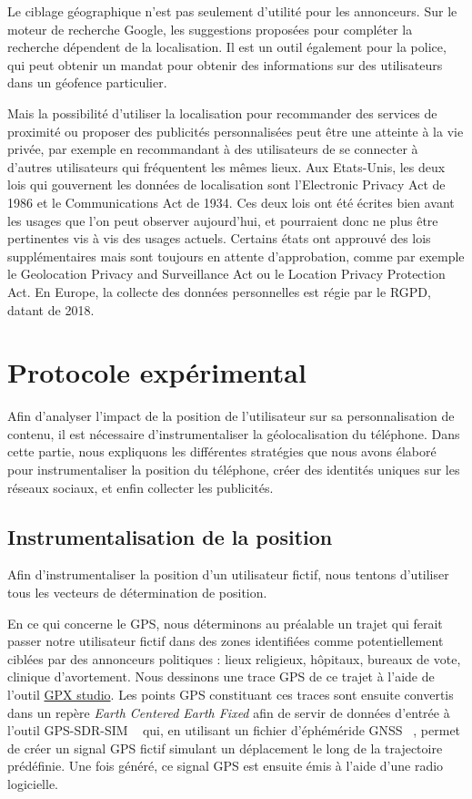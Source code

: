 \documentclass[runningheads]{llncs}
\begin{document}
Le ciblage géographique n'est pas seulement d'utilité pour les annonceurs. Sur le moteur de recherche Google, les suggestions proposées pour compléter la recherche dépendent de la localisation. Il est un outil également pour la police, qui peut obtenir un mandat pour obtenir des informations sur des utilisateurs dans un géofence particulier\cite{ng_how_nodate}.


Mais la possibilité d'utiliser la localisation pour recommander des services de proximité ou proposer des publicités personnalisées peut être une atteinte à la vie privée, par exemple en recommandant à des utilisateurs de se connecter à d'autres utilisateurs qui fréquentent les mêmes lieux. Aux Etats-Unis, les deux lois qui gouvernent les données de localisation sont l'Electronic Privacy Act de
1986 et le Communications Act de 1934. Ces deux lois ont été écrites bien avant les usages que l'on peut observer aujourd'hui, et pourraient donc ne plus être pertinentes vis à vis des usages actuels. Certains états ont approuvé des lois supplémentaires mais sont toujours en attente d'approbation, comme par exemple le Geolocation Privacy and Surveillance Act ou le Location Privacy Protection Act. En Europe, la collecte des données personnelles est régie par le RGPD, datant de 2018\cite{karanja_unintended_2018}.


\section{Protocole expérimental}

Afin d'analyser l'impact de la position de l'utilisateur sur sa personnalisation de contenu, il est nécessaire d'instrumentaliser la géolocalisation du téléphone. 
Dans cette partie, nous expliquons les différentes stratégies que nous avons élaboré pour instrumentaliser la position du téléphone, créer des identités uniques sur les réseaux sociaux, et enfin collecter les publicités.


\subsection{Instrumentalisation de la position}\label{instrumentalisation_position}

Afin d'instrumentaliser la position d'un utilisateur fictif, nous tentons d'utiliser tous les vecteurs de détermination de position.

En ce qui concerne le GPS, nous déterminons au préalable un trajet qui ferait passer notre utilisateur fictif dans des zones identifiées comme potentiellement ciblées par des annonceurs politiques : lieux religieux, hôpitaux, bureaux de vote, clinique d'avortement. Nous dessinons une trace GPS de ce trajet à l'aide de l'outil \href{https://gpxstudio.github.io/}{GPX studio}. Les points GPS constituant ces traces sont ensuite convertis dans un repère \textit{Earth Centered Earth Fixed} afin de servir de données d'entrée à l'outil GPS-SDR-SIM ~\cite{osqzss_osqzssgps-sdr-sim_2020} qui, en utilisant un fichier d'éphéméride GNSS ~\cite{national_aeronautics_and_space_administration_gnss_2020}, permet de créer un signal GPS fictif simulant un déplacement le long de la trajectoire prédéfinie. Une fois généré, ce signal GPS est ensuite émis à l'aide d'une radio logicielle.
\end{document}

